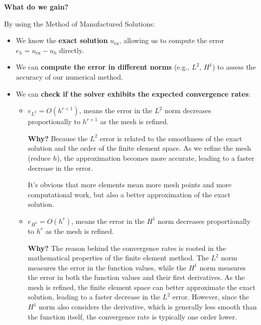 \highspace
\begin{flushleft}
    \textcolor{Green3}{ \textbf{What do we gain?}}
\end{flushleft}
By using the Method of Manufactured Solutions:
\begin{itemize}
    \item We know the \textbf{exact solution} $u_\text{ex}$, allowing us to compute the error $e_h = u_\text{ex} - u_h$ directly.
    \item We can \textbf{compute the error in different norms} (e.g., $L^2$, $H^1$) to assess the accuracy of our numerical method.
    \item We can \textbf{check if the solver exhibits the expected convergence rates}:
    \begin{itemize}
        \item $e_{L^2} = O\left(h^{r+1}\right)$, means the error in the $L^2$ norm decreases proportionally to $h^{r+1}$ as the mesh is refined.
        
        \textcolor{Green3}{ \textbf{Why?}} Because the $L^2$ error is related to the smoothness of the exact solution and the order of the finite element space. As we refine the mesh (reduce $h$), the approximation becomes more accurate, leading to a faster decrease in the error.

        It's obvious that more elements mean more mesh points and more computational work, but also a better approximation of the exact solution.


        \item $e_{H^1} = O\left(h^r\right)$, means the error in the $H^1$ norm decreases proportionally to $h^r$ as the mesh is refined.
        
        \textcolor{Green3}{ \textbf{Why?}} The reason behind the convergence rates is rooted in the mathematical properties of the finite element method. The $L^2$ norm measures the error in the function values, while the $H^1$ norm measures the error in both the function values and their first derivatives. As the mesh is refined, the finite element space can better approximate the exact solution, leading to a faster decrease in the $L^2$ error. However, since the $H^1$ norm also considers the derivative, which is generally less smooth than the function itself, the convergence rate is typically one order lower.
    \end{itemize}
\end{itemize}